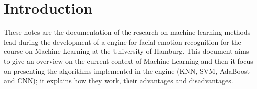\section{Introduction}

These notes are the documentation of the research on machine learning methods lead during the development of a engine for facial emotion recognition for the course on Machine Learning at the University of Hamburg. This document aims to give an overview on the current context of Machine Learning and then it focus on presenting the algorithms implemented in the engine (KNN, SVM, AdaBoost and CNN); it explains how they work, their advantages and disadvantages.